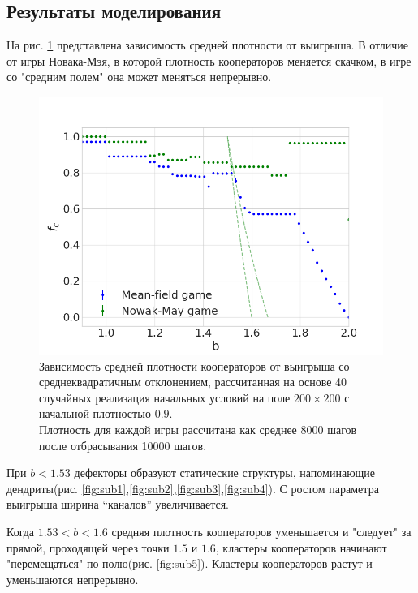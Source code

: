 \documentclass[12pt]{article}
\begin{document}
    \subsection{Результаты моделирования}
        На рис. \ref{fig:payoffvsdensity} представлена зависимость средней плотности от выигрыша. В отличие от игры Новака-Мэя, в которой плотность кооператоров меняется скачком\cite{KOLOTEV2018}, в игре со "средним полем" она может меняться непрерывно.
        \begin{figure}[!h]
            \centering
            \captionsetup{justification=centering}
            \includegraphics[width=\textwidth]{MeanFieldGame/density_NovakMay_Mean_game.png}
            \caption{Зависимость средней плотности кооператоров от выигрыша со среднеквадратичным отклонением, рассчитанная на основе 40 случайных реализация начальных условий на поле $200\times200$ с начальной плотностью $0.9$.\\
            Плотность для каждой игры рассчитана как среднее 8000 шагов после отбрасывания 10000 шагов. 
            }
            \label{fig:payoffvsdensity}
        \end{figure}

        При $b < 1.53$ дефекторы образуют статические структуры, напоминающие дендриты(рис. \ref{fig:sub1},\ref{fig:sub2},\ref{fig:sub3},\ref{fig:sub4}). С ростом параметра выигрыша ширина “каналов” увеличивается.

        Когда $1.53<b<1.6$ средняя плотность кооператоров уменьшается и "следует" за прямой, проходящей через точки $1.5$ и $1.6$, кластеры кооператоров начинают "перемещаться" по полю(рис. \ref{fig:sub5}). Кластеры кооператоров растут и уменьшаются непрерывно.
\end{document}
